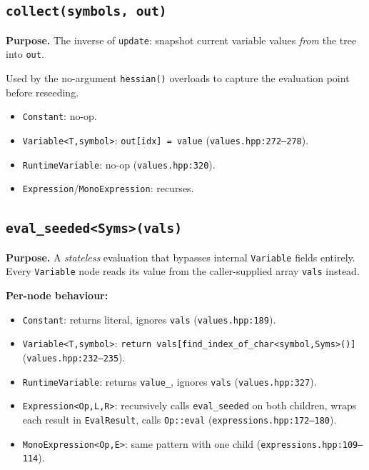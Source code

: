 \documentclass[11pt,a4paper]{article}
\newcommand{\code}[1]{\texttt{#1}}
\begin{document}
\subsection{\texttt{collect(symbols, out)}}
\label{sec:collect}

\textbf{Purpose.} The inverse of \code{update}: snapshot current variable
values \emph{from} the tree into \code{out}.

Used by the no-argument \code{hessian()} overloads to capture the evaluation
point before reseeding.

\begin{itemize}
  \item \code{Constant}: no-op.
  \item \code{Variable<T,symbol>}: \code{out[idx] = value}
    (\texttt{values.hpp:272--278}).
  \item \code{RuntimeVariable}: no-op (\texttt{values.hpp:320}).
  \item \code{Expression}/\code{MonoExpression}: recurses.
\end{itemize}

\subsection{\texttt{eval\_seeded<Syms>(vals)}}
\label{sec:evalseeded}

\textbf{Purpose.} A \emph{stateless} evaluation that bypasses internal
\code{Variable} fields entirely.  Every \code{Variable} node reads its value
from the caller-supplied array \code{vals} instead.

\medskip\noindent\textbf{Per-node behaviour:}
\begin{itemize}
  \item \code{Constant}: returns literal, ignores \code{vals}
    (\texttt{values.hpp:189}).
  \item \code{Variable<T,symbol>}: \code{return vals[find\_index\_of\_char<symbol,Syms>()]}
    (\texttt{values.hpp:232--235}).
  \item \code{RuntimeVariable}: returns \code{value\_}, ignores \code{vals}
    (\texttt{values.hpp:327}).
  \item \code{Expression<Op,L,R>}: recursively calls \code{eval\_seeded} on
    both children, wraps each result in \code{EvalResult}, calls
    \code{Op::eval} (\texttt{expressions.hpp:172--180}).
  \item \code{MonoExpression<Op,E>}: same pattern with one child
    (\texttt{expressions.hpp:109--114}).
\end{itemize}
\end{document}
